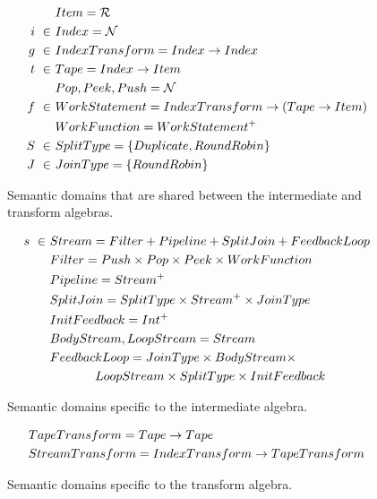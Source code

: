 \begin{figure}[t]
\scriptsize
\begin{align*}
&Item = \mathcal{R} \\
i~\in~&Index = \mathcal{N} \\
g~\in~&IndexTransform = Index \rightarrow Index \\
t~\in~&Tape = Index \rightarrow Item \\
&Pop, Peek, Push = \mathcal{N} \\ 
f~\in~&WorkStatement = IndexTransform \rightarrow (Tape \rightarrow Item) \\ 
&WorkFunction = WorkStatement^{+} \\
S~\in~&SplitType = \{Duplicate, RoundRobin\} \\ 
J~\in~&JoinType = \{RoundRobin\}
\end{align*}
\vspace{-18pt}
\caption{Semantic domains that are shared between the intermediate and
  transform algebras.
\protect\label{fig:shareddom}}
\vspace{3pt}
\begin{align*}
s~\in~&Stream = Filter + Pipeline + SplitJoin + FeedbackLoop \\
&Filter = Push \times Pop \times Peek \times WorkFunction \\
&Pipeline = Stream^{+} \\
&SplitJoin = SplitType \times Stream^{+} \times JoinType \\
&InitFeedback = Int^{+} \\
&BodyStream, LoopStream = Stream \\
&FeedbackLoop = JoinType \times BodyStream \times \\
& \hspace{0.5in} LoopStream \times SplitType \times InitFeedback
\end{align*}
\vspace{-18pt}
\caption{Semantic domains specific to the intermediate algebra.
\protect\label{fig:interdom}}
\vspace{3pt}
\begin{align*}
&TapeTransform = Tape \rightarrow Tape \\
&StreamTransform =  IndexTransform \rightarrow TapeTransform
\end{align*}
\vspace{-18pt}
\caption{Semantic domains specific to the transform algebra.
\protect\label{fig:transformdom}}
\end{figure}

